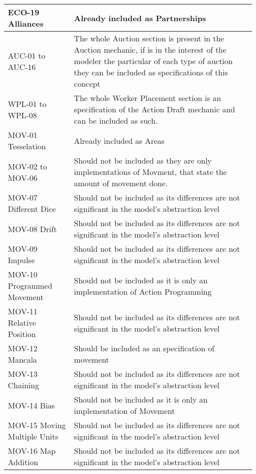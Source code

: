 \begin{longtable}{|m{7cm}|m{7cm}|}
        ECO-19 Alliances & Already included as Partnerships \\
        \hline
        AUC-01 to AUC-16 & The whole Auction section is present in the Auction mechanic, if is in the interest of the modeler the particular of each type of auction they can be included as specifications of this concept \\
        \hline
        WPL-01 to WPL-08 & The whole Worker Placement section is an specification of the Action Draft mechanic and can be included as such. \\
        \hline
        MOV-01 Tesselation & Already included as Areas \\
        \hline
        MOV-02 to MOV-06 & Should not be included as they are only implementations of Movment, that state the amount of movement done. \\
        \hline
        MOV-07 Different Dice  & Should not be included as its differences are not significant in the model's abstraction level\\
        \hline
        MOV-08 Drift & Should not be included as its differences are not significant in the model's abstraction level \\
        \hline
        MOV-09 Impulse & Should not be included as its differences are not significant in the model's abstraction level \\
        \hline
        MOV-10 Programmed Movement & Should not be included as it is only an implementation of Action Programming \\
        \hline
        MOV-11 Relative Position & Should not be included as its differences are not significant in the model's abstraction level\\
        \hline
        MOV-12 Mancala & Should be included as an specification of movement \\
        \hline
        MOV-13 Chaining & Should not be included as its differences are not significant in the model's abstraction level \\
        \hline
        MOV-14 Bias & Should not be included as it is only an implementation of Movement\\
        \hline
        MOV-15 Moving Multiple Units & Should not be included as its differences are not significant in the model's abstraction level \\
        \hline
        MOV-16 Map Addition & Should not be included as its differences are not significant in the model's abstraction level\\

\end{longtable}
